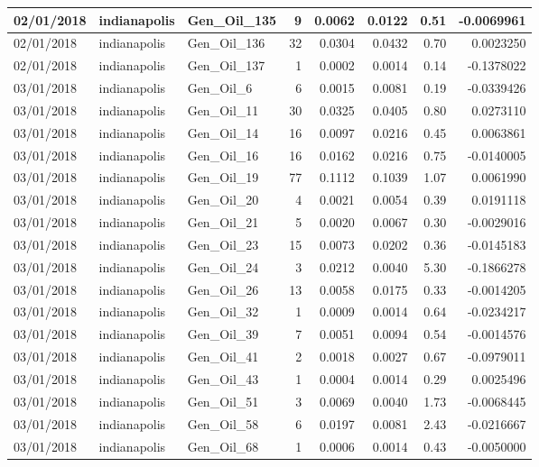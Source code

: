 \documentclass[
  letterpaper,
  DIV=11,
  numbers=noendperiod]{scrartcl}
\begin{document}
\begin{tabular}{l|l|l|r|r|r|r|r}
\hline
02/01/2018 & indianapolis & Gen\_Oil\_135 & 9 & 0.0062 & 0.0122 & 0.51 & -0.0069961\\
\hline
02/01/2018 & indianapolis & Gen\_Oil\_136 & 32 & 0.0304 & 0.0432 & 0.70 & 0.0023250\\
\hline
02/01/2018 & indianapolis & Gen\_Oil\_137 & 1 & 0.0002 & 0.0014 & 0.14 & -0.1378022\\
\hline
03/01/2018 & indianapolis & Gen\_Oil\_6 & 6 & 0.0015 & 0.0081 & 0.19 & -0.0339426\\
\hline
03/01/2018 & indianapolis & Gen\_Oil\_11 & 30 & 0.0325 & 0.0405 & 0.80 & 0.0273110\\
\hline
03/01/2018 & indianapolis & Gen\_Oil\_14 & 16 & 0.0097 & 0.0216 & 0.45 & 0.0063861\\
\hline
03/01/2018 & indianapolis & Gen\_Oil\_16 & 16 & 0.0162 & 0.0216 & 0.75 & -0.0140005\\
\hline
03/01/2018 & indianapolis & Gen\_Oil\_19 & 77 & 0.1112 & 0.1039 & 1.07 & 0.0061990\\
\hline
03/01/2018 & indianapolis & Gen\_Oil\_20 & 4 & 0.0021 & 0.0054 & 0.39 & 0.0191118\\
\hline
03/01/2018 & indianapolis & Gen\_Oil\_21 & 5 & 0.0020 & 0.0067 & 0.30 & -0.0029016\\
\hline
03/01/2018 & indianapolis & Gen\_Oil\_23 & 15 & 0.0073 & 0.0202 & 0.36 & -0.0145183\\
\hline
03/01/2018 & indianapolis & Gen\_Oil\_24 & 3 & 0.0212 & 0.0040 & 5.30 & -0.1866278\\
\hline
03/01/2018 & indianapolis & Gen\_Oil\_26 & 13 & 0.0058 & 0.0175 & 0.33 & -0.0014205\\
\hline
03/01/2018 & indianapolis & Gen\_Oil\_32 & 1 & 0.0009 & 0.0014 & 0.64 & -0.0234217\\
\hline
03/01/2018 & indianapolis & Gen\_Oil\_39 & 7 & 0.0051 & 0.0094 & 0.54 & -0.0014576\\
\hline
03/01/2018 & indianapolis & Gen\_Oil\_41 & 2 & 0.0018 & 0.0027 & 0.67 & -0.0979011\\
\hline
03/01/2018 & indianapolis & Gen\_Oil\_43 & 1 & 0.0004 & 0.0014 & 0.29 & 0.0025496\\
\hline
03/01/2018 & indianapolis & Gen\_Oil\_51 & 3 & 0.0069 & 0.0040 & 1.73 & -0.0068445\\
\hline
03/01/2018 & indianapolis & Gen\_Oil\_58 & 6 & 0.0197 & 0.0081 & 2.43 & -0.0216667\\
\hline
03/01/2018 & indianapolis & Gen\_Oil\_68 & 1 & 0.0006 & 0.0014 & 0.43 & -0.0050000\\

\end{tabular}
\end{document}
